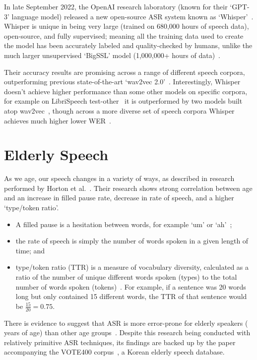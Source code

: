 In late September 2022, the OpenAI research laboratory (known for their `GPT-3' language model)
released a new open-source ASR system known as `Whisper'~\cite{whisper}.
Whisper is unique in being very large (trained on 680,000 hours of speech data), open-source, and
fully supervised;
meaning all the training data used to create the model has been accurately labeled and
quality-checked by humans, unlike the much larger unsupervised `BigSSL' model (1,000,000+ hours
of data)~\cite{bigssl}.

Their accuracy results are promising across a range of different speech corpora, outperforming
previous state-of-the-art `wav2vec 2.0'~\cite{wav2vec}.
Interestingly, Whisper doesn't achieve higher performance than some other models on specific
corpora, for example on LibriSpeech test-other~\cite{librispeech} it is outperformed by
two models built atop wav2vec~\cite{zhang2020,chung2021}, though across a more diverse set
of speech corpora Whisper achieves much higher lower WER~\cite{whisper}.\\

\section{Elderly Speech}\label{sec:elderly-speech}

As we age, our speech changes in a variety of ways, as described in research
performed by Horton et al.~\cite{Horton2010}.
Their research shows strong correlation between age and an increase in filled pause rate,
decrease in rate of speech, and a higher `type/token ratio'.

\begin{itemize}
    \item A filled pause is a hesitation between words, for example `um' or
    `ah'~\cite{Maclay1959Jan};
    \item the rate of speech is simply the number of words spoken in a given length of time;
    and
    \item type/token ratio (TTR) is a measure of vocabulary diversity, calculated as a ratio of
    the number of unique different words spoken (types) to the total number of words spoken
    (tokens)~\cite{richards_1987}.
    For example, if a sentence was 20 words long but only contained 15 different words, the TTR of
    that sentence would be $\frac{15}{20} = 0.75$.
\end{itemize}

There is evidence to suggest that ASR is more error-prone for elderly speakers ( years of
age) than other age groups~\cite{picone1990}.
Despite this research being conducted with relatively primitive ASR techniques, its findings are
backed up by the paper accompanying the VOTE400 corpus~\cite{vote400}, a Korean elderly speech
database.


